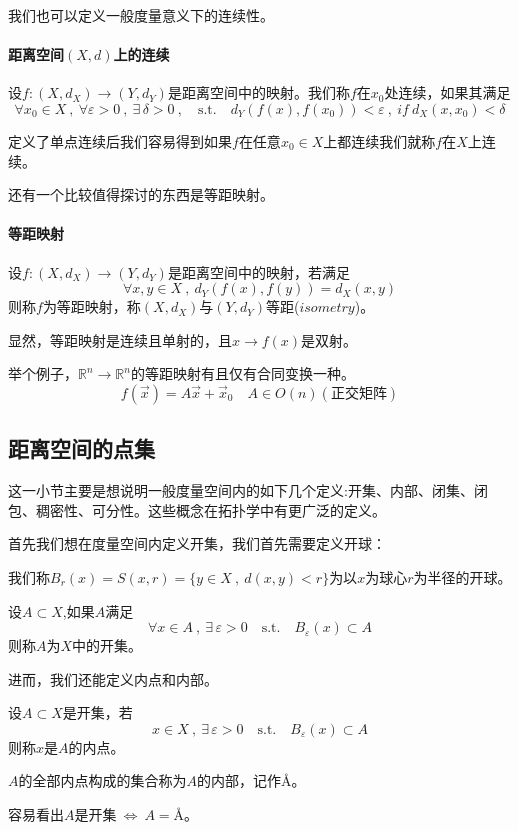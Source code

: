 我们也可以定义一般度量意义下的连续性。
\paragraph*{距离空间$(X,d)$上的连续} \quad 设$f:(X,d_X) \rightarrow (Y,d_Y)$是距离空间中的映射。我们称$f$在$x_0$处连续，如果其满足
\[\forall x_0 \in X \ , \ \forall \varepsilon>0 \ , \ \exists \, \delta>0 \ , \quad \text{s.t.} \quad d_Y(f(x),f(x_0))<\varepsilon \ , \ if \ d_X(x,x_0)<\delta\]

定义了单点连续后我们容易得到如果$f$在任意$x_0 \in X$上都连续我们就称$f$在$X$上连续。

还有一个比较值得探讨的东西是等距映射。
\paragraph*{等距映射} \quad 设$f:(X,d_X) \rightarrow (Y,d_Y)$是距离空间中的映射，若满足
\[\forall x,y \in X \ , \ d_Y(f(x),f(y))=d_X(x,y)\]
则称$f$为等距映射，称$(X,d_X)$与$(Y,d_Y)$等距($isometry$)。

显然，等距映射是连续且单射的，且$x \rightarrow f(x)$是双射。

举个例子，$\mathbb{R}^n \rightarrow \mathbb{R}^n$的等距映射有且仅有合同变换一种。
\[f(\overrightarrow{x})=A\overrightarrow{x}+\overrightarrow{x}_0 \quad A \in O(n)(\text{正交矩阵})\]

\subsection{距离空间的点集} \label{pointset}
这一小节主要是想说明一般度量空间内的如下几个定义:开集、内部、闭集、闭包、稠密性、可分性。这些概念在拓扑学中有更广泛的定义。

首先我们想在度量空间内定义开集，我们首先需要定义开球：
\begin{definition}[开球]
    我们称$B_r(x)=S(x,r)=\{y \in X \ , \ d(x,y)<r\}$为以$x$为球心$r$为半径的开球。
\end{definition}
\begin{definition}[开集]
    设$A \subset X$,如果$A$满足
    \[\forall x \in A \ , \ \exists \, \varepsilon>0 \quad \text{s.t.} \quad B_{\varepsilon}(x) \subset A\]
    则称$A$为$X$中的开集。
\end{definition}
进而，我们还能定义内点和内部。
\begin{definition}[内点]
    设$A \subset X$是开集，若
    \[x \in X \ , \ \exists \, \varepsilon>0 \quad \text{s.t.} \quad B_{\varepsilon}(x) \subset A\]
    则称$x$是$A$的内点。
\end{definition}
\begin{definition}[内部]
    $A$的全部内点构成的集合称为$A$的内部，记作\AA。
\end{definition}
容易看出$A$是开集$ \ \Leftrightarrow \ A=$\AA。

